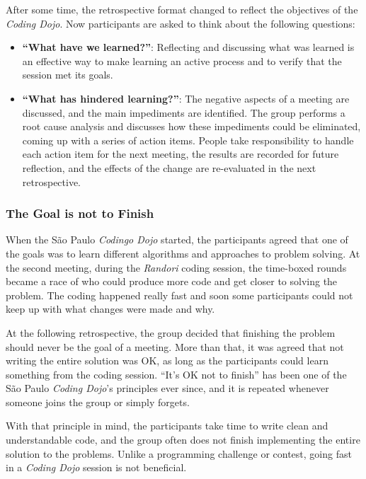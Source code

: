 After some time, the retrospective format changed to reflect the
objectives of the \emph{Coding Dojo}. Now participants are asked to
think about the following questions:

\begin{itemize}
\item \textbf{``What have we learned?''}: Reflecting and discussing
  what was learned is an effective way to make learning an active
  process and to verify that the session met its goals.
\item \textbf{``What has hindered learning?''}: The negative aspects
  of a meeting are discussed, and the main impediments are
  identified. The group performs a root cause analysis and discusses
	how these impediments could be eliminated, coming up
	with a series of action items. People take responsibility
  to handle each action item for the next meeting, the results are
	recorded for future reflection, and the effects of the change are
	re-evaluated in the next retrospective.
\end{itemize}

\subsubsection{The Goal is not to Finish}

When the São Paulo \emph{Codingo Dojo} started, the participants
agreed that one of the goals was to learn different algorithms and
approaches to problem solving. At the second meeting, during the
\emph{Randori} coding session, the time-boxed rounds became a race
of who could produce more code and get closer to solving the
problem. The coding happened really fast and soon some participants
could not keep up with what changes were made and why.

At the following retrospective, the group decided that finishing the
problem should never be the goal of a meeting. More than that, it was
agreed that not writing the entire solution was OK, as long as the
participants could learn something from the coding session. ``It's OK
not to finish'' has been one of the São Paulo \emph{Coding Dojo}'s
principles ever since, and it is repeated whenever someone joins the
group or simply forgets.

With that principle in mind, the participants take time to write clean and
understandable code, and the group often does not finish implementing the
entire solution to the problems. Unlike a programming challenge or contest,
going fast in a \emph{Coding Dojo} session is not beneficial.

